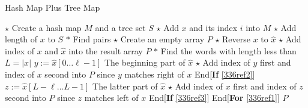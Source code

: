 \setcounter{algorithm}{0}
\begin{algorithm}[H]
\caption{Hash Map Plus Tree Map}
\begin{algorithmic}[1]
\State $\star$ Create a hash map $M$ and a tree set $S$
\State $\star$ Add $x$ and its index $i$ into $M$
\State $\star$ Add length of $x$ to $S$
\EndFor
\State $\ast$ Find pairs
\State $\star$ Create an empty array $P$
\State $\star$ Reverse $x$ to $ \hat{x} $
\State $\star$ Add index of $x$ and $\hat{x}$ into the result array $P$ 
\EndIf
\State $\ast$ Find the words with length less than $L=\lvert x\rvert$
 \label{336ref1}
\label{336ref2}
\State $y:=\hat{x}[0\ldots \ell-1]$ \Comment The beginning part of $\hat{x}$
\State $\star$ Add index of $y$ first and index of $x$ second into $P$ since $y$ matches right of $x$
\EndIf
\EndIf \Comment End[\textbf{If} \ref{336ref2}]
 \label{336ref3}
\State $z:=\hat{x}[L-\ell\ldots L-1]$ \Comment The latter part of $\hat{x}$
\State $\star$ Add index of $x$ first and index of $z$ second into $P$ since $z$ matches left of $x$
\EndIf
\EndIf \Comment End[\textbf{If} \ref{336ref3}]
\EndFor \Comment End[\textbf{For} \ref{336ref1}]
\EndFor
\State \Return $P$
\EndProcedure
\end{algorithmic}
\end{algorithm}


